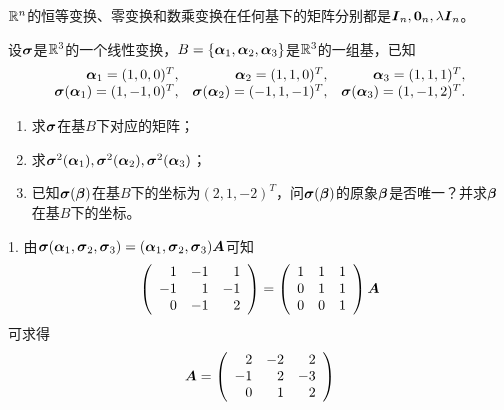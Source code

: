 \begin{frame}
  \begin{li}
    $\mathbb R^n$的恒等变换、零变换和数乘变换在任何基下的矩阵分别都是$\MI_n, \M0_{n},\lambda \MI_n $。
  \end{li}
\end{frame}

\begin{frame}
  \begin{li}
    设$\boldsymbol{\sigma}$是$\mathbb R^3$的一个线性变换，$B=\{\boldsymbol{\alpha}_1,\boldsymbol{\alpha}_2,\boldsymbol{\alpha}_3\}$是$\mathbb R^3$的一组基，已知
    $$
    \begin{array}{rrr}
      \boldsymbol{\alpha}_1=(1,0,0)^T,&\boldsymbol{\alpha}_2=(1,1,0)^T,&\boldsymbol{\alpha}_3=(1,1,1)^T,\\
      \boldsymbol{\sigma}(\boldsymbol{\alpha}_1)=(1,-1,0)^T,&\boldsymbol{\sigma}(\boldsymbol{\alpha}_2)=(-1,1,-1)^T,&\boldsymbol{\sigma}(\boldsymbol{\alpha}_3)=(1,-1,2)^T.
    \end{array}
    $$
    \begin{enumerate}
      \item 求$\boldsymbol{\sigma}$在基$B$下对应的矩阵；
      \item 求$\boldsymbol{\sigma}^2(\boldsymbol{\alpha}_1),\boldsymbol{\sigma}^2(\boldsymbol{\alpha}_2),\boldsymbol{\sigma}^2(\boldsymbol{\alpha}_3)$；
      \item 已知$\boldsymbol{\sigma}(\boldsymbol{\beta})$在基$B$下的坐标为$(2,1,-2)^T$，问$\boldsymbol{\sigma}(\boldsymbol{\beta})$的原象$\boldsymbol{\beta}$是否唯一？并求$\boldsymbol{\beta}$在基$B$下的坐标。
    \end{enumerate}
  \end{li}

\end{frame}

\begin{frame}
  \begin{jie}
    1. 由$\boldsymbol{\sigma}(\boldsymbol{\alpha}_1,\boldsymbol{\sigma}_2,\boldsymbol{\sigma}_3)=(\boldsymbol{\alpha}_1,\boldsymbol{\sigma}_2,\boldsymbol{\sigma}_3)\boldsymbol{A}$可知
    $$
    \left(
      \begin{array}{rrr}
        1&-1&1\\
        -1&1&-1\\
        0&-1&2
      \end{array}
    \right)=\left(
      \begin{array}{rrr}
        1&1&1\\
        0&1&1\\
        0&0&1
      \end{array}
    \right)\boldsymbol{A}
    $$
    可求得
    $$
    \boldsymbol{A}=\left(
      \begin{array}{rrr}
        2&-2&2\\
        -1&2&-3\\
        0&1&2
      \end{array}
    \right)
    $$
  \end{jie}
\end{frame}

